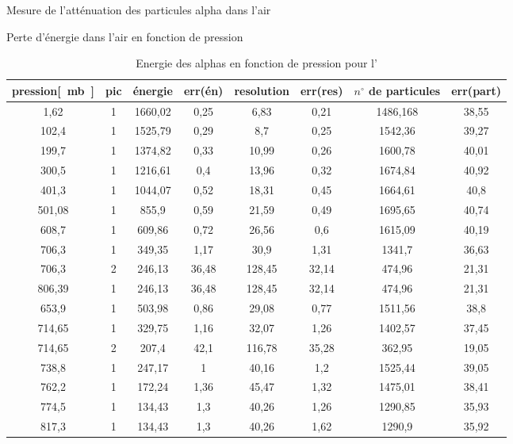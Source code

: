 \documentclass[a4paper,11pt]{scrartcl}
\begin{document}
 \begin{section}{Mesure de l'atténuation des particules alpha dans l'air}
  \begin{subsection}{Perte d'énergie dans l'air en fonction de pression}
   \begin{table}[H]
    \caption{Energie des alphas en fonction de pression pour l'}
    \begin{center}
     \begin{tabular}{|c||c|c|c|c|c|c|c|}
      \hline 
      pression\unit{[mb]} & pic	&	énergie	&	err(én)	&	resolution	&	err(res)	&	$n^{\circ}$ de particules	&	err(part) 	\\ \hline\hline
      1,62	&	1	&	1660,02	&	0,25	&	6,83	&	0,21	&	1486,168	&	38,55	\\ \hline
      102,4	&	1	&	1525,79	&	0,29	&	8,7	&	0,25	&	1542,36	&	39,27	\\ \hline
      199,7	&	1	&	1374,82	&	0,33	&	10,99	&	0,26	&	1600,78	&	40,01	\\ \hline
      300,5	&	1	&	1216,61	&	0,4	&	13,96	&	0,32	&	1674,84	&	40,92	\\ \hline
      401,3	&	1	&	1044,07	&	0,52	&	18,31	&	0,45	&	1664,61	&	40,8	\\ \hline
      501,08	&	1	&	855,9	&	0,59	&	21,59	&	0,49	&	1695,65	&	40,74	\\ \hline
      608,7	&	1	&	609,86	&	0,72	&	26,56	&	0,6	&	1615,09	&	40,19	\\ \hline
      706,3	&	1	&	349,35	&	1,17	&	30,9	&	1,31	&	1341,7	&	36,63	\\ \hline
      706,3	&	2	&	246,13	&	36,48	&	128,45	&	32,14	&	474,96	&	21,31	\\ \hline
      806,39	&	1	&	246,13	&	36,48	&	128,45	&	32,14	&	474,96	&	21,31	\\ \hline
      653,9	&	1	&	503,98	&	0,86	&	29,08	&	0,77	&	1511,56	&	38,8	\\ \hline
      714,65	&	1	&	329,75	&	1,16	&	32,07	&	1,26	&	1402,57	&	37,45	\\ \hline
      714,65	&	2	&	207,4	&	42,1	&	116,78	&	35,28	&	362,95	&	19,05	\\ \hline
      738,8	&	1	&	247,17	&	1	&	40,16	&	1,2	&	1525,44	&	39,05	\\ \hline
      762,2	&	1	&	172,24	&	1,36	&	45,47	&	1,32	&	1475,01	&	38,41	\\ \hline
      774,5	&	1	&	134,43	&	1,3	&	40,26	&	1,26	&	1290,85	&	35,93	\\ \hline
      817,3	&	1	&	134,43	&	1,3	&	40,26	&	1,62	&	1290,9	&	35,92	\\ \hline

\end{tabular}
\end{center}
\end{table}
\end{subsection}
\end{section}
\end{document}
